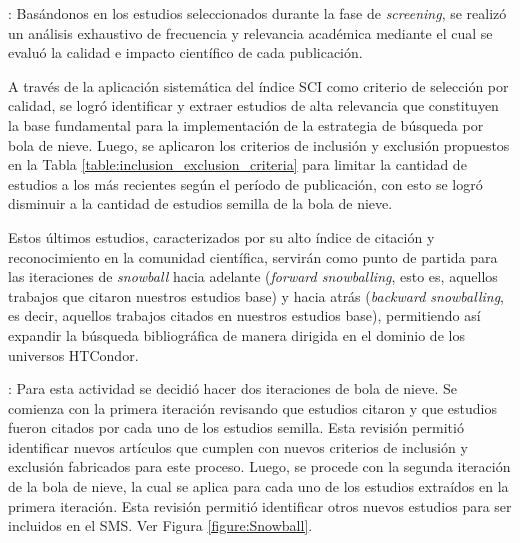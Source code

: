 : Basándonos en los \screenTot{} estudios seleccionados durante la fase de \textit{screening}, se realizó un análisis exhaustivo de frecuencia y relevancia académica mediante el cual se evaluó la calidad e impacto científico de cada publicación.

A través de la aplicación sistemática del índice SCI como criterio de selección por calidad, se logró identificar y extraer \csiSelected{} estudios de alta relevancia que constituyen la base fundamental para la implementación de la estrategia de búsqueda por bola de nieve. Luego, se aplicaron los criterios de inclusión y exclusión propuestos en la Tabla \ref{table:inclusion_exclusion_criteria} para limitar la cantidad de estudios a los más recientes según el período de publicación, con esto se logró disminuir a \newSnowballStudies{} la cantidad de estudios semilla de la bola de nieve.

Estos últimos estudios, caracterizados por su alto índice de citación y reconocimiento en la comunidad científica, servirán como punto de partida para las iteraciones de \textit{snowball} hacia adelante (\textit{forward snowballing}, esto es, aquellos trabajos que citaron nuestros estudios base) y hacia atrás (\textit{backward snowballing}, es decir, aquellos trabajos citados en nuestros estudios base), permitiendo así expandir la búsqueda bibliográfica de manera dirigida en el dominio de los universos HTCondor.


: Para esta actividad se decidió hacer dos iteraciones de bola de nieve. Se comienza con la primera iteración revisando que estudios citaron y que estudios fueron citados por cada uno de los \newSnowballStudies{} estudios semilla. Esta revisión permitió identificar \firstSnowballIterationStudies{} nuevos artículos que cumplen con nuevos criterios de inclusión y exclusión fabricados para este proceso. Luego, se procede con la segunda iteración de la bola de nieve, la cual se aplica para cada uno de los \firstSnowballIterationStudies{} estudios extraídos en la primera iteración. Esta revisión permitió identificar otros \secondSnowballIterationStudies{} nuevos estudios para ser incluidos en el SMS. Ver Figura \ref{figure:Snowball}.\\


